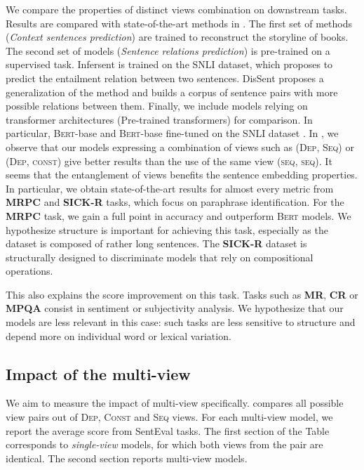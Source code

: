 We compare the properties of distinct views combination on downstream tasks. Results are compared with state-of-the-art methods in . The first set of methods (\textsl{Context sentences prediction}) are trained to reconstruct the storyline of  books. %
The second set of models (\textsl{Sentence relations prediction}) is pre-trained on a supervised task. Infersent \parencite{conneau_17} is trained on the SNLI dataset, which proposes to predict the entailment relation between two sentences. DisSent \parencite{nie_19} proposes a generalization of the method and builds a corpus of sentence pairs with more possible relations between them. Finally, we include models relying on transformer architectures (Pre-trained transformers) for comparison. In particular, \textsc{Bert}-base and \textsc{Bert}-base fine-tuned on the SNLI dataset \parencite{reimers_19}. 
In , we observe that our models expressing a combination of views such as (\textsc{Dep}, \textsc{Seq}) or (\textsc{Dep}, \textsc{const}) give better results than the use of the same view (\textsc{seq}, \textsc{seq}). It seems that the entanglement of views benefits the sentence embedding properties. In particular, we obtain state-of-the-art results for almost every metric from \textbf{MRPC} and \textbf{SICK-R} tasks, which focus on paraphrase identification. For the \textbf{MRPC} task, we gain a full point in accuracy and outperform \textsc{Bert} models. We hypothesize structure is important for achieving this task, especially as the dataset is composed of rather long sentences. The \textbf{SICK-R} dataset is structurally designed to discriminate models that rely on compositional operations. 

This also explains the score improvement on this task. Tasks such as \textbf{MR}, \textbf{CR} or \textbf{MPQA} consist in sentiment or subjectivity analysis. We hypothesize that our models are less relevant in this case: such tasks are less sensitive to structure and depend more on individual word or lexical variation.

\subsection{Impact of the multi-view}

We aim to measure the impact of multi-view specifically.  compares all possible view pairs out of \textsc{Dep}, \textsc{Const} and \textsc{Seq} views. For each multi-view model, we report the average score from SentEval tasks. The first section of the Table corresponds to \textit{single-view} models, for which both views from the pair are identical. The second section reports multi-view models. 

